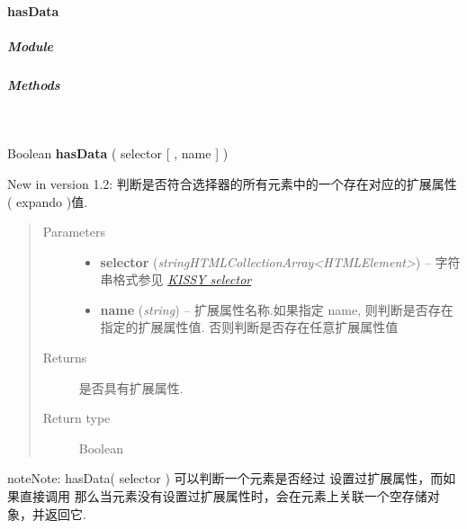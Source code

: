 \documentclass[letterpaper,10pt,english]{sphinxmanual}
\begin{document}
\paragraph{hasData}
\label{api/core/dom/hasData::doc}\label{api/core/dom/hasData:hasdata}

\subparagraph{Module}
\label{api/core/dom/hasData:module}\begin{quote}

{\hyperref[api/core/dom/index:module-DOM]{}}
\end{quote}


\subparagraph{Methods}
\label{api/core/dom/hasData:methods}

\begin{fulllineitems}
\label{api/core/dom/hasData:DOM.hasData}~
\begin{DUlineblock}{0em}
\item[] Boolean \textbf{hasData} ( selector {[} , name {]} )
\end{DUlineblock}
New in version 1.2: 判断是否符合选择器的所有元素中的一个存在对应的扩展属性( expando )值.\begin{quote}\begin{description}
\item[{Parameters}] \leavevmode\begin{itemize}
\item {}
\textbf{selector} (\emph{string\textbar{}HTMLCollection\textbar{}Array\textless{}HTMLElement\textgreater{}}) -- 字符串格式参见 {\hyperref[api/core/dom/selector:dom-selector]{\emph{KISSY selector}}}

\item {}
\textbf{name} (\emph{string}) -- 扩展属性名称.如果指定 name, 则判断是否存在指定的扩展属性值. 否则判断是否存在任意扩展属性值

\end{itemize}

\item[{Returns}] \leavevmode
是否具有扩展属性.

\item[{Return type}] \leavevmode
Boolean

\end{description}\end{quote}

\end{fulllineitems}


\begin{notice}{note}{Note:}
hasData( selector ) 可以判断一个元素是否经过 {\hyperref[api/core/dom/data:DOM.data]{}} 设置过扩展属性，而如果直接调用 
那么当元素没有设置过扩展属性时，会在元素上关联一个空存储对象，并返回它.
\end{notice}
\end{document}
